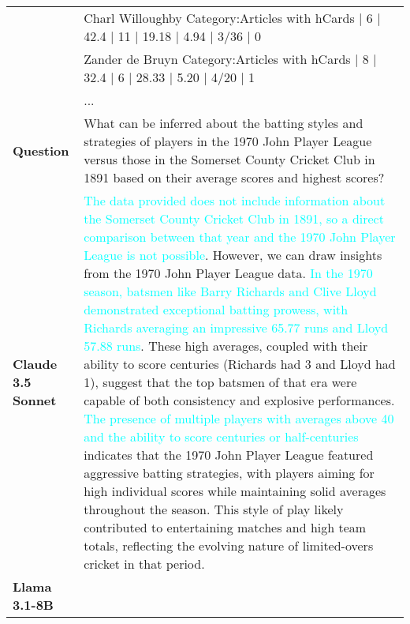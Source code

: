 \begin{table*}[htbp]
\begin{small}
\begin{tabularx}{\textwidth}{%
>{\arraybackslash}p{}
>{\arraybackslash}X
}
& [ROW 2] Charl Willoughby Category:Articles with hCards | 6 | 42.4 | 11 | 19.18 | 4.94 | 3/36 | 0 \\
& [ROW 3] Zander de Bruyn Category:Articles with hCards | 8 | 32.4 | 6 | 28.33 | 5.20 | 4/20 | 1 \\
& ... \\ \midrule
\textbf{Question}
& What can be inferred about the batting styles and strategies of players in the 1970 John Player League versus those in the Somerset County Cricket Club in 1891 based on their average scores and highest scores? \\ \midrule
\textbf{Claude 3.5 Sonnet}
& \textcolor{cyan}{The data provided does not include information about the Somerset County Cricket Club in 1891, so a direct comparison between that year and the 1970 John Player League is not possible}. However, we can draw insights from the 1970 John Player League data. \textcolor{cyan}{In the 1970 season, batsmen like Barry Richards and Clive Lloyd demonstrated exceptional batting prowess, with Richards averaging an impressive 65.77 runs and Lloyd 57.88 runs}. These high averages, coupled with their ability to score centuries (Richards had 3 and Lloyd had 1), suggest that the top batsmen of that era were capable of both consistency and explosive performances. \textcolor{cyan}{The presence of multiple players with averages above 40 and the ability to score centuries or half-centuries} indicates that the 1970 John Player League featured aggressive batting strategies, with players aiming for high individual scores while maintaining solid averages throughout the season. This style of play likely contributed to entertaining matches and high team totals, reflecting the evolving nature of limited-overs cricket in that period. \\ \midrule
\textbf{Llama 3.1-8B}

\end{tabularx}
\end{small}
\end{table*}
